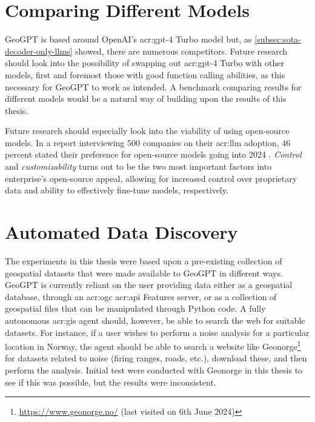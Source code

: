\section{Comparing Different Models}
\label{sec:comparing-different-models}

GeoGPT is based around OpenAI's \acrshort{acr:gpt}-4 Turbo model but, as \autoref{subsec:sota-decoder-only-llms} showed, there are numerous competitors. Future research should look into the possibility of swapping out \acrshort{acr:gpt}-4 Turbo with other models, first and foremost those with good function calling abilities, as this necessary for GeoGPT to work as intended. A benchmark comparing results for different models would be a natural way of building upon the results of this thesis.

Future research should especially look into the viability of using open-source models. In a report interviewing 500 companies on their \acrshort{acr:llm} adoption, 46 percent stated their preference for open-source models going into 2024 \citep{wangsarah16ChangesWay2024}. \textit{Control} and \textit{customizability} turns out to be the two most important factors into enterprise's open-source appeal, allowing for increased control over proprietary data and ability to effectively fine-tune models, respectively.

\section{Automated Data Discovery}
\label{sec:automated-data-discovery}

The experiments in this thesis were based upon a pre-existing collection of geospatial datasets that were made available to GeoGPT in different ways. GeoGPT is currently reliant on the user providing data either as a geospatial database, through an \acrshort{acr:ogc} \acrshort{acr:api} Features server, or as a collection of geospatial files that can be manipulated through Python code. A fully autonomous \acrshort{acr:gis} agent should, however, be able to search the web for suitable datasets. For instance, if a user wishes to perform a noise analysis for a particular location in Norway, the agent should be able to search a website like Geonorge\footnote{\url{https://www.geonorge.no/} (last visited on 6th June 2024)} for datasets related to noise (firing ranges, roads, etc.), download these, and then perform the analysis. Initial test were conducted with Geonorge in this thesis to see if this was possible, but the results were inconsistent.
